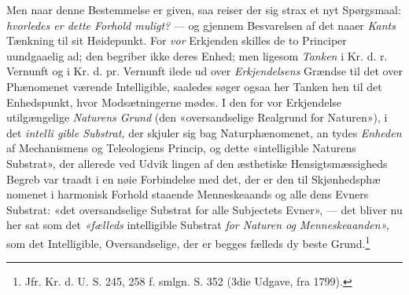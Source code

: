 Men naar denne Bestemmelse er given, saa reiser der sig
strax et nyt Spørgsmaal: \emph{hvorledes er dette Forhold
muligt?} --- og gjennem Besvarelsen af det naaer \emph{Kants}
Tænkning til sit Høidepunkt. For \emph{vor} Erkjenden skilles de
to Principer uundgaaelig ad; den begriber ikke deres Enhed;
men ligesom \emph{Tanken} i Kr. d. r. Vernunft og i Kr. d. pr.
Vernunft ilede ud over \emph{Erkjendelsens} Grændse til det over
Phænomenet værende Intelligible, saaledes søger ogsaa her
Tanken hen til det Enhedspunkt, hvor Modsætningerne mødes.
I den for vor Erkjendelse utilgængelige \emph{Naturens Grund}
(den «oversandselige Realgrund for Naturen»), i det \emph{intelli\-%
gible Substrat,} der skjuler sig bag Naturphænomenet, an\-%
\setcounter{footnote}{0}%
tydes \emph{Enheden} af Mechanismens og Teleologiens Princip, og
dette «intelligible Naturens Substrat», der allerede ved Udvik\-%
lingen af den æsthetiske Hensigtsmæssigheds Begreb var traadt
i en nøie Forbindelse med det, der er den til Skjønhedsphæ\-%
nomenet i harmonisk Forhold staaende Menneskeaands og alle
dens Evners Substrat: «det oversandselige Substrat for alle
Subjectets Evner», --- det bliver nu her sat som det \emph{«fælleds}
intelligible Substrat \emph{for Naturen og Menneskeaanden»,}
som det Intelligible, Oversandselige, der er begges fælleds dy\-%
beste Grund.\footnote{Jfr. Kr. d. U. S. 245, 258 f. smlgn. S. 352 (3die
Udgave, fra 1799).}


